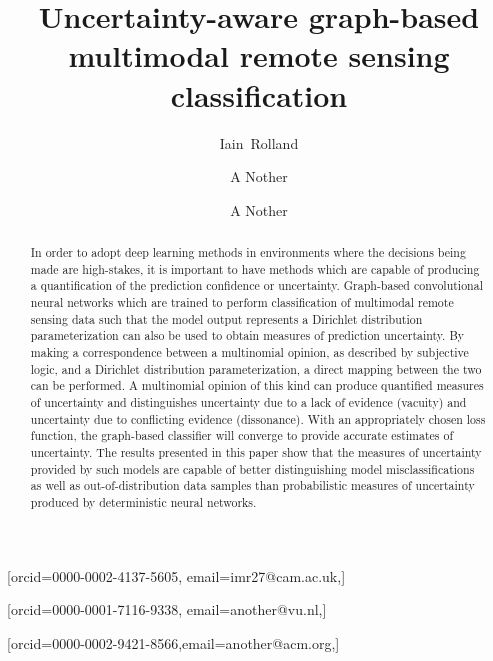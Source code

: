 \documentclass[
twocolumn,
]{ceurart}
\begin{document}


\title{Uncertainty-aware graph-based multimodal remote sensing classification}

\author[1]{Iain~Rolland}[orcid=0000-0002-4137-5605, email=imr27@cam.ac.uk,]

\address[1]{Department of Engineering, University of Cambridge, Cambridge, CB2 1PZ United Kingdom}
\address[2]{Department of Physics and Technology, UiT the Arctic University of Norway, P.O. box 6050 Langnes, NO-9037, Tromsø, Norway}

\author[1]{A Nother}[orcid=0000-0001-7116-9338, email=another@vu.nl,]

\author[1]{A Nother}[orcid=0000-0002-9421-8566,email=another@acm.org,]

\begin{abstract}
In order to adopt deep learning methods in environments where the decisions being made are high-stakes, it is important to have methods which are capable of producing a quantification of the prediction confidence or uncertainty.
Graph-based convolutional neural networks which are trained to perform classification of multimodal remote sensing data such that the model output represents a Dirichlet distribution parameterization can also be used to obtain measures of prediction uncertainty.
By making a correspondence between a multinomial opinion, as described by subjective logic, and a Dirichlet distribution parameterization, a direct mapping between the two can be performed.
A multinomial opinion of this kind can produce quantified measures of uncertainty and distinguishes uncertainty due to a lack of evidence (vacuity) and uncertainty due to conflicting evidence (dissonance).
With an appropriately chosen loss function, the graph-based classifier will converge to provide accurate estimates of uncertainty.
The results presented in this paper show that the measures of uncertainty provided by such models are capable of better distinguishing model misclassifications as well as out-of-distribution data samples than probabilistic measures of uncertainty produced by deterministic neural networks.
\end{abstract}
\end{document}
